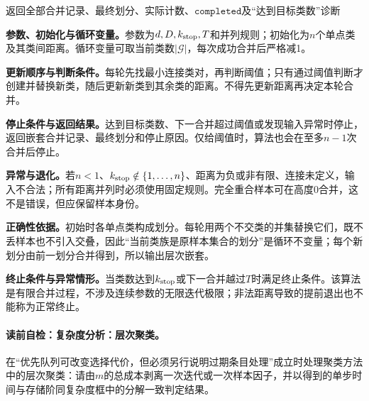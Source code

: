 \begin{AlgorithmContract}
\begin{algorithm}[!t]
返回全部合并记录、最终划分、实际计数、$\mathtt{completed}$及“达到目标类数”诊断\;
\end{algorithm}
\end{AlgorithmContract}

\textbf{参数、初始化与循环变量。}参数为$d,D,k_{\rm stop},T$和并列规则；初始化为$n$个单点类及其类间距离。循环变量可取当前类数$|\mathcal G|$，每次成功合并后严格减1。

\textbf{更新顺序与判断条件。}每轮先找最小连接类对，再判断阈值；只有通过阈值判断才创建并替换新类，随后更新新类到其余类的距离。不得先更新距离再决定本轮合并。

\textbf{停止条件与返回结果。}达到目标类数、下一合并超过阈值或发现输入异常时停止，返回嵌套合并记录、最终划分和停止原因。仅给阈值时，算法也会在至多$n-1$次合并后停止。

\textbf{异常与退化。}若$n<1$、$k_{\rm stop}\notin\{1,\ldots,n\}$、距离为负或非有限、连接未定义，输入不合法；所有距离并列时必须使用固定规则。完全重合样本可在高度0合并，这不是错误，但应保留样本身份。

\textbf{正确性依据。}初始时各单点类构成划分。每轮用两个不交类的并集替换它们，既不丢样本也不引入交叠，因此“当前类族是原样本集合的划分”是循环不变量；每个新划分由前一划分合并得到，所以输出层次嵌套。

\textbf{终止条件与异常情形。}当类数达到$k_{\rm stop}$或下一合并越过$T$时满足终止条件。该算法是有限合并过程，不涉及连续参数的无限迭代极限；非法距离导致的提前退出也不能称为正常终止。

\paragraph{读前自检：复杂度分析：层次聚类。}在“优先队列可改变选择代价，但必须另行说明过期条目处理”成立时处理聚类方法中的层次聚类：请由$m$的总成本剥离一次迭代或一次样本因子，并以得到的单步时间与存储阶同复杂度框中的分解一致判定结果。\par

